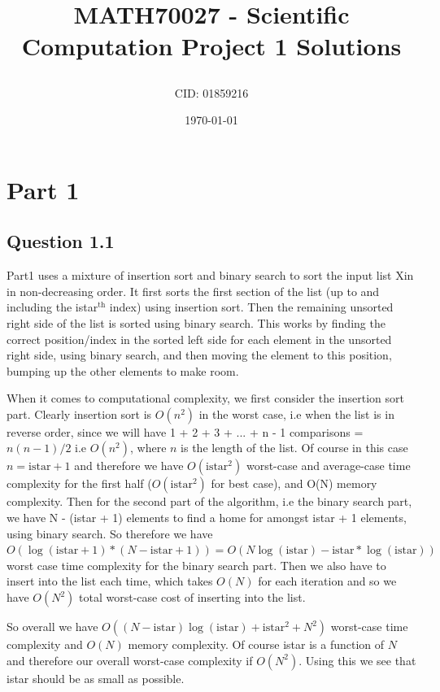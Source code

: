 \documentclass[a4paper, oneside]{book}
\title{MATH70027 - Scientific Computation Project 1 Solutions\author{CID: 01859216}\date{\today}}
\begin{document}
\maketitle


\section*{Part 1}

\subsection*{Question 1.1}
Part1 uses a mixture of insertion sort and binary search to sort the input
list Xin in non-decreasing order.
It first sorts the first section of the list (up to and including the istar$^\text{th}$ index)
using insertion sort. Then the remaining unsorted right side of the list is sorted
using binary search. This works by finding the correct position/index in the sorted left side
for each element in the unsorted right side, using binary search, and then moving the element
to this position, bumping up the other elements to make room.

When it comes to computational complexity, we first consider the insertion sort part.
Clearly insertion sort is $O(n^2)$ in the worst case, i.e when the list is in reverse order,
since we will have 1 + 2 + 3 + ... + n - 1 comparisons = $n(n-1)/2$ i.e $O(n^2)$, where $n$ is
the length of the list. Of course in this case $n = \text{istar} + 1$ and therefore we have
$O(\text{istar}^2)$ worst-case and average-case time complexity for the first half ($O(\text{istar}^2)$ for best case), and O(N) memory complexity.
Then for the second part of the algorithm, i.e the binary search part, we have
N - (istar + 1) elements to find a home for amongst istar + 1 elements, using binary search.
So therefore we have $O(\log(\text{istar} + 1) * (N - \text{istar} + 1)) = O(N\log(\text{istar}) - \text{istar} * \log(\text{istar}))$ worst case time complexity for the binary search part.
Then we also have to insert into the list each time, which takes $O(N)$ for each iteration
and so we have $O(N^2)$ total worst-case cost of inserting into the list.

So overall we have $O((N - \text{istar})\log(\text{istar}) + \text{istar}^2 + N^2)$ worst-case time complexity and $O(N)$ memory complexity.
Of course istar is a function of $N$ and therefore our overall worst-case complexity if $O(N^2)$.
Using this we see that istar should be as small as possible.
\end{document}
